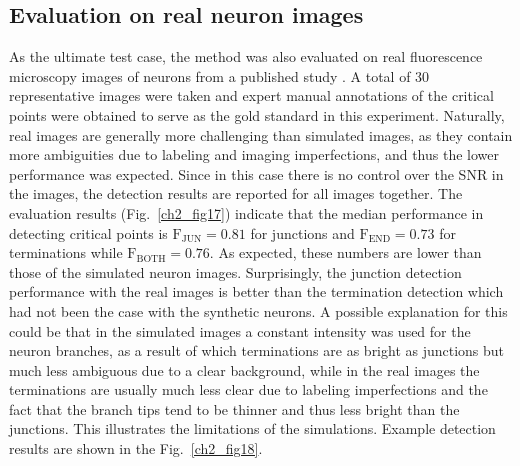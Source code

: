 \subsection{Evaluation on real neuron images}
\label{ch2:subsec:experiments-real}
As the ultimate test case, the method was also evaluated on real fluorescence microscopy images of neurons from a published study \cite{steiner2002overexpression}. A total of 30 representative images were taken and expert manual annotations of the critical points were obtained to serve as the gold standard in this experiment. Naturally, real images are generally more challenging than simulated images, as they contain more ambiguities due to labeling and imaging imperfections, and thus the lower performance was expected. Since in this case there is no control over the SNR in the images, the detection results are reported for all images together. The evaluation results (Fig.~\ref{ch2_fig17}) indicate that the median performance in detecting critical points is $\textrm{F}_{\textrm{JUN}}=0.81$ for junctions and $\textrm{F}_{\textrm{END}}=0.73$ for terminations while $\textrm{F}_{\textrm{BOTH}}=0.76$. As expected, these numbers are lower than those of the simulated neuron images. Surprisingly, the junction detection performance with the real images is better than the termination detection which had not been the case with the synthetic neurons. A possible explanation for this could be that in the simulated images a constant intensity was used for the neuron branches, as a result of which terminations are as bright as junctions but much less ambiguous due to a clear background, while in the real images the terminations are usually much less clear due to labeling imperfections and the fact that the branch tips tend to be thinner and thus less bright than the junctions. This illustrates the limitations of the simulations. Example detection results are shown in the Fig.~\ref{ch2_fig18}.
